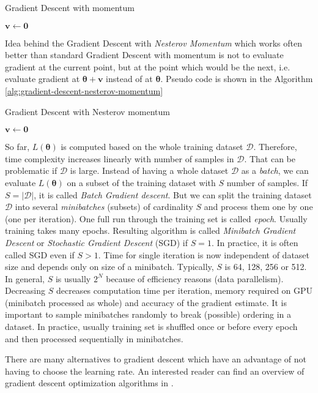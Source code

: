 \begin{algorithm}[htb]
\caption{Gradient Descent with momentum}
\label{alg:gradient-descent-momentum}


$\pmb v \leftarrow \pmb 0$
\end{algorithm}

Idea behind the Gradient Descent with \textit{Nesterov Momentum} which works often better than standard Gradient Descent with momentum is not to evaluate gradient at the current point, but at the point which would be the next, i.e. evaluate gradient at $\pmb \theta + \pmb v$ instead of at $\pmb \theta$. Pseudo code is shown in the Algorithm \ref{alg:gradient-descent-nesterov-momentum}

\begin{algorithm}[htb]
\caption{Gradient Descent with Nesterov momentum}
\label{alg:gradient-descent-nesterov-momentum}


$\pmb v \leftarrow \pmb 0$
\end{algorithm}

So far, $L(\pmb \theta)$ is computed based on the whole training dataset $\mathcal{D}$. Therefore, time complexity increases linearly with number of samples in $\mathcal{D}$. That can be problematic if $\mathcal{D}$ is large. Instead of having a whole dataset $\mathcal{D}$ as a \textit{batch}, we can evaluate $L(\pmb \theta)$ on a subset of the training dataset with $S$ number of samples. If $S = |\mathcal{D}|$, it is called \textit{Batch Gradient descent}. But we can split the training dataset $\mathcal{D}$ into several \textit{minibatches} (subsets) of cardinality $S$ and process them one by one (one per iteration). One full run through the training set is called \textit{epoch}. Usually training takes many epochs. Resulting algorithm is called \textit{Minibatch Gradient Descent} or \textit{Stochastic Gradient Descent} (SGD) if $S = 1$. In practice, it is often called SGD even if $S > 1$. Time for single iteration is now independent of dataset size and depends only on size of a minibatch. Typically, $S$ is 64, 128, 256 or 512. In general, $S$ is usually $2^{N}$ because of efficiency reasons (data parallelism). Decreasing $S$ decreases computation time per iteration, memory required on GPU 	(minibatch processed as whole) and accuracy of the gradient estimate. It is important to sample minibatches randomly to break (possible) ordering in a dataset. In practice, usually training set is shuffled once or before every epoch and then processed sequentially in minibatches. 


There are many alternatives to gradient descent which have an advantage of not having to choose the learning rate. An interested reader can find an overview of gradient descent optimization algorithms in \cite{gradient-descent-overview}. 



